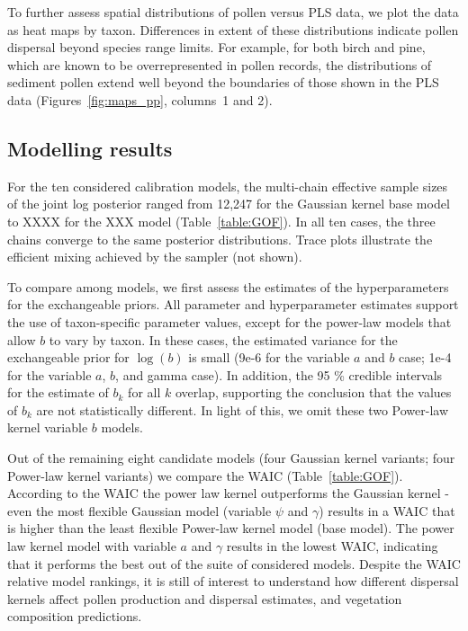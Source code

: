 \documentclass[12pt]{article}
\begin{document}
To further assess spatial distributions of pollen versus PLS data, we
plot the data as heat maps by taxon. Differences in extent of these
distributions indicate pollen dispersal beyond species range
limits. For example, for both birch and pine, which are known to be
overrepresented in pollen records, the distributions of sediment
pollen extend well beyond the boundaries of those shown in the PLS
data (Figures~\ref{fig:maps_pp}, columns~1 and 2).

\subsection{Modelling results}

For the ten considered calibration models, the multi-chain effective
sample sizes of the joint log posterior ranged from 12,247 for the
Gaussian kernel base model to XXXX for the XXX model
(Table~\ref{table:GOF}). In all ten cases, the three chains converge
to the same posterior distributions. Trace plots illustrate the
efficient mixing achieved by the sampler (not shown).

To compare among models, we first assess the estimates of the
hyperparameters for the exchangeable priors. All parameter and
hyperparameter estimates support the use of taxon-specific parameter
values, except for the power-law models that allow $b$ to vary by
taxon. In these cases, the estimated variance for the exchangeable
prior for $\log ( b )$ is small (9e-6 for the variable $a$ and $b$
case; 1e-4 for the variable $a$, $b$, and gamma case). In addition,
the 95 \% credible intervals for the estimate of $b_k$ for all $k$
overlap, supporting the conclusion that the values of $b_k$ are not
statistically different. In light of this, we omit these two
Power-law kernel variable $b$ models.

Out of the remaining eight candidate models (four Gaussian kernel
variants; four Power-law kernel variants) we compare the WAIC
(Table~\ref{table:GOF}). According to the WAIC the power law kernel
outperforms the Gaussian kernel - even the most flexible Gaussian
model (variable $\psi$ and $\gamma$) results in a WAIC that is higher
than the least flexible Power-law kernel model (base model). The power
law kernel model with variable $a$ and $\gamma$ results in the lowest
WAIC, indicating that it performs the best out of the suite of
considered models. Despite the WAIC relative model rankings, it is
still of interest to understand how different dispersal kernels affect
pollen production and dispersal estimates, and vegetation composition
predictions.
\end{document}
